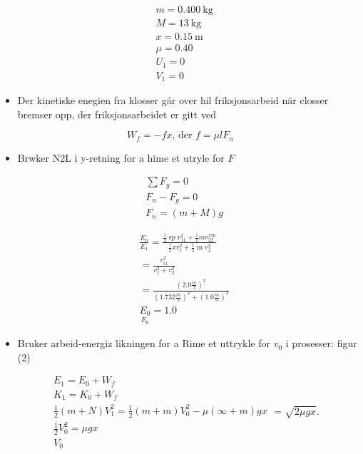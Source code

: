 \documentclass[10pt]{article}
\begin{document}
$$
\begin{aligned}
& m=0.400 \mathrm{~kg} \\
& M=13 \mathrm{~kg} \\
& x=0.15 \mathrm{~m} \\
& \mu=0.40 \\
& U_{1}=0 \\
& V_{1}=0
\end{aligned}
$$

\begin{itemize}
  \item Der kinetiske enegien fra klosser gár over hil friksjonsarbeid när closser bremser opp, der friksjonsarbeidet er gitt ved
\end{itemize}

$$
W_{f}=-f x \text {, der } f=\mu l F_{n}
$$

\begin{itemize}
  \item Brwker N2L i y-retning for a hime et utryle for $F$
\end{itemize}

$$
\begin{aligned}
& \sum F_{y}=0 \\
& F_{n}-F_{g}=0 \\
& F_{n}=(m+M) g
\end{aligned}
$$

$$
\begin{aligned}
& \frac{E_{0}}{E_{1}}=\frac{\frac{1}{2} \operatorname{sp} v_{11}^{2}+\frac{1}{2} m v_{22}^{270}}{\frac{1}{2} x v_{1}^{2}+\frac{1}{2} \operatorname{m} v_{2}^{2}} \\
& =\frac{v_{i 1}^{2}}{v_{1}^{2}+v_{2}^{2}} \\
& =\frac{\left(2.0 \frac{m}{3}\right)^{2}}{\left(1.732 \frac{m}{3}\right)^{2}+\left(1.0 \frac{m}{0}\right)^{2}} \\
& \underset{E_{0}}{E_{0}}=1.0
\end{aligned}
$$

\begin{itemize}
  \item Bruker arbeid-energiz likningen for a Rime et uttrykle for $v_{0}$ i prosesser: figur (2)
\end{itemize}

$$
\begin{aligned}
& E_{1}=E_{0}+W_{f} \\
& K_{1}=K_{0}+W_{f} \\
& \frac{1}{2}(m+N) V_{1}^{2}=\frac{1}{2}(m+m) V_{0}^{2}-\mu(\infty+m) g x \\
& \frac{1}{2} V_{0}^{2}=\mu g x \\
& V_{0}
\end{aligned}=\sqrt{2 \mu g x} .
$$
\end{document}
